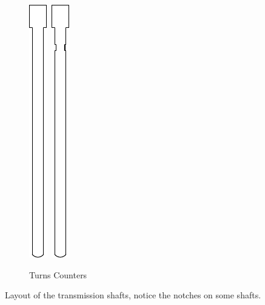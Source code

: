 \documentclass[openany]{book}
\begin{document}
\begin{figure}[!ht]
\begin{subfigure}{.4\textwidth}
		\includegraphics[width=.05\textwidth]{images/transmission-shaft.pdf}\, 
		\includegraphics[width=.05\textwidth]{images/transmission-turns-one.pdf}  
		\caption{Turns Counters}
	\end{subfigure}
	\caption{Layout of the transmission shafts, notice the notches on some shafts.}
	\label{fig:transmission:shafts}
\end{figure}
\end{document}
